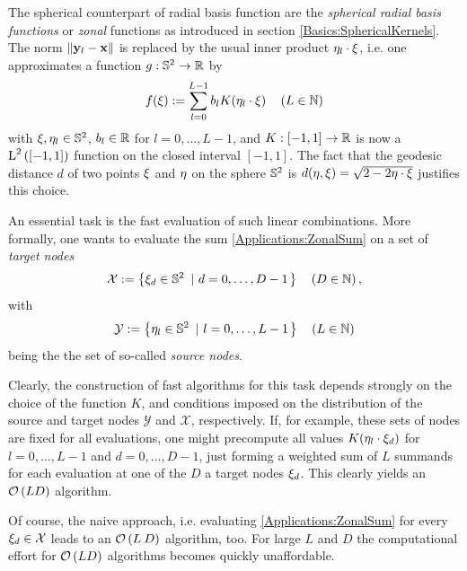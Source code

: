 The spherical counterpart of radial basis function are the \emph{spherical radial basis functions} or \emph{zonal} functions as introduced in section 
\ref{Basics:SphericalKernels}. The norm $\left\|\mathbf{y}_{l}-\mathbf{x}\right\|$ is replaced 
by the usual inner product $\mathbf{\eta}_{l}\cdot\mathbf{\xi}$, i.e. one
approximates a function $g: \mathbb{S}^2 \rightarrow \mathbb{R}$ by
\begin{equation}
  \label{Applications:ZonalSum}
  f{\hspace{-0.4ex}}\left(\mathbf{\xi}\right) := \sum_{l=0}^{L-1} b_{l} K{\hspace{-0.4ex}}\left(\mathbf{\eta}_{l}\cdot\mathbf{\xi}\right) \quad \left(L \in \mathbb{N}\right)
\end{equation}
with $\mathbf{\xi}, \mathbf{\eta}_{l} \in \mathbb{S}^2$, $b_{l} \in \mathbb{R}$ for $l=0,\ldots,L-1$, and 
$K: [-1,1] \rightarrow \mathbb{R}$ is now a $\text{\rm{L}}^{2}\left([-1,1]\right)$ function on the closed interval $[-1,1]$. 
The fact that the geodesic distance $d$ of two points $\mathbf{\xi}$ and $\mathbf{\eta}$ on the 
sphere $\mathbb{S}^2$ is $d{\hspace{-0.4ex}}\left(\mathbf{\eta},\mathbf{\xi}\right) = 
\sqrt{2-2\mathbf{\eta}\cdot\mathbf{\xi}}$ justifies this choice.

An essential task is the fast evaluation of such linear combinations. More formally, 
one wants to evaluate the sum \eqref{Applications:ZonalSum}
on a set of \emph{target nodes} 
$$
  \mathcal{X} := \left\{\mathbf{\xi}_{d} \in \mathbb{S}^2\ \left|\ d=0,\ldots,D-1\right.\right\rbrace \quad \left(D \in \mathbb{N}\right),
$$ 
with 
$$
  \mathcal{Y} := \left\{\mathbf{\eta}_{l} \in \mathbb{S}^2\ \left|\ l = 0,\ldots,L-1\right.\right\rbrace \quad \left(L \in \mathbb{N}\right)
$$
being the the set of so-called \emph{source nodes}.

Clearly, the construction of fast algorithms for this task depends strongly on the
choice of the function $K$, and conditions imposed on the distribution of the 
source and target nodes $\mathcal{Y}$ and $\mathcal{X}$, respectively.
If, for example, these sets of nodes are fixed for all evaluations, one might 
precompute all values $ K{\hspace{-0.4ex}}\left(\mathbf{\eta}_{l}\cdot\mathbf{\xi}_{d}\right)$ for $l=0,\ldots,L-1$ and 
$d=0,\ldots,D-1$, just forming a weighted sum of $L$ summands for each evaluation 
at one of the $D$ a target nodes $\mathbf{\xi}_{d}$. This clearly yields an $\mathcal{O}\left(L D\right)$ algorithm.

Of course, the naive approach, i.e. evaluating \eqref{Applications:ZonalSum} for every $\mathbf{\xi}_{d} 
\in \mathcal{X}$ leads to an $\mathcal{O}\left(L\:D\right)$ algorithm, too. 
For large $L$ and $D$ the computational effort for $\mathcal{O}\left(L D\right)$ algorithms 
becomes quickly unaffordable.

